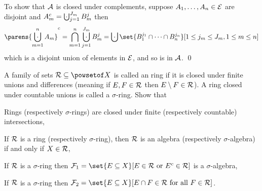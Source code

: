 To show that ${\cal A}$ is closed under complements, suppose $A_1,\dots,A_n\in{\cal E}$ are disjoint and $A_m^c=\bigdcup_{j=1}^{J_m}B_m^j$ then
$$ \parens{\bigdcup_{m=1}^nA_m}^c = \bigcap_{m=1}^n\bigdcup_{j=1}^{J_m}B^j_m = \bigdcup\set{B_1^{j_1}\cap\cdots\cap B_n^{j_n}}[1\leq j_m\leq J_m,1\leq m\leq n] $$
which is a disjoint union of elements in ${\cal E}$, and so is in ${\cal A}$.
\qed

\bexerc

    A family of sets ${\cal R}\subseteq\powsetof X$ is called an {\emphcolor ring} if it is closed under finite unions and differences (meaning if $E,F\in{\cal R}$ then $E\setminus F\in{\cal R}$).
    A ring closed under countable unions is called a {\emphcolor $\sigma$-ring}.
    Show that
    \benum
        \item Rings (respectively $\sigma$-rings) are closed under finite (respectively countable) intersections,
        \item If ${\cal R}$ is a ring (respectively $\sigma$-ring), then ${\cal R}$ is an algebra (respectively $\sigma$-algebra) if and only if $X\in{\cal R}$,
        \item If ${\cal R}$ is a $\sigma$-ring then ${\cal F}_1=\set{E\subseteq X}[E\in{\cal R}\hbox{ or }E^c\in{\cal R}]$ is a $\sigma$-algebra,
        \item If ${\cal R}$ is a $\sigma$-ring then ${\cal F}_2=\set{E\subseteq X}[E\cap F\in{\cal R}\hbox{ for all }F\in{\cal R}]$.
    \eenum

\eexerc

